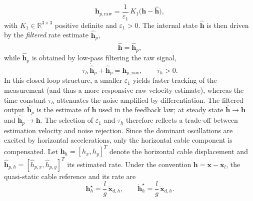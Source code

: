 \documentclass[sn-mathphys-num]{sn-jnl}
\theoremstyle{thmstyleone}%
\theoremstyle{thmstyletwo}%
\theoremstyle{thmstylethree}%
\begin{document}
\begin{equation}\label{eq:h_raw} \mathbf{h}_{p,\mathrm{raw}} = \frac{1}{\varepsilon_1}\,K_1\big(\mathbf{h}-\hat{\mathbf{h}}\big), 
\end{equation} 
with $K_1\in\mathbb{R}^{3\times 3}$ positive definite and $\varepsilon_1>0$. The internal state $\hat{\mathbf{h}}$ is then driven by the \emph{filtered} rate estimate $\hat{\mathbf{h}}_p$, 
\begin{equation}\label{eq:h_hat_dyn} \dot{\hat{\mathbf{h}}} = \hat{\mathbf{h}}_p, \end{equation} 
while $\hat{\mathbf{h}}_p$ is obtained by low-pass filtering the raw signal, 
\begin{equation}\label{eq:h_p_filter} \tau_h\,\dot{\hat{\mathbf{h}}}_p + \hat{\mathbf{h}}_p = \mathbf{h}_{p,\mathrm{raw}}, \qquad \tau_h>0. 
\end{equation} 
In this closed-loop structure, a smaller $\varepsilon_1$ yields faster tracking of the measurement (and thus a more responsive raw velocity estimate), whereas the time constant $\tau_h$ attenuates the noise amplified by differentiation. The filtered output $\hat{\mathbf{h}}_p$ is the estimate of $\dot{\mathbf{h}}$ used in the feedback law; at steady state $\hat{\mathbf{h}}\to\mathbf{h}$ and $\hat{\mathbf{h}}_p\to\dot{\mathbf{h}}$. The selection of $\varepsilon_1$ and $\tau_h$ therefore reflects a trade-off between estimation velocity and noise rejection. Since the dominant oscillations are excited by horizontal accelerations, only the horizontal cable component is compensated. Let $\mathbf{h}_h=[h_x,h_y]^T$ denote the horizontal cable displacement and $\hat{\mathbf{h}}_{p,h}=[\hat{h}_{p,x}, \hat{h}_{p,y}]^T$ its estimated rate. Under the convention $\mathbf{h}=\mathbf{x}-\mathbf{x}_l$, the quasi-static cable reference and its rate are
\begin{equation}\label{eq:href}
\mathbf{h}_h^\star = \frac{l}{g}\,\ddot{\mathbf{x}}_{d,h},\qquad
\dot{\mathbf{h}}_h^\star = \frac{l}{g}\,\dddot{\mathbf{x}}_{d,h}.
\end{equation}
\end{document}
